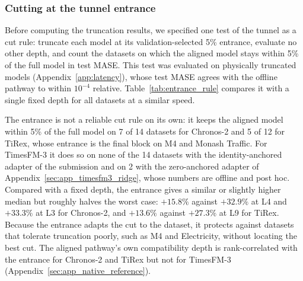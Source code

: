 
\subsubsection{Cutting at the tunnel entrance}
\label{sec:app_entrance_rule}

Before computing the truncation results, we specified one test of the tunnel as a cut rule: truncate each model at its validation-selected 5\% entrance, evaluate no other depth, and count the datasets on which the aligned model stays within 5\% of the full model in test MASE. This test was evaluated on physically truncated models (Appendix~\ref{app:latency}), whose test MASE agrees with the offline pathway to within $10^{-4}$ relative. Table~\ref{tab:entrance_rule} compares it with a single fixed depth for all datasets at a similar speed.

The entrance is not a reliable cut rule on its own: it keeps the aligned model within 5\% of the full model on 7 of 14 datasets for Chronos-2 and 5 of 12 for TiRex, whose entrance is the final block on M4 and Monash Traffic. For TimesFM-3 it does so on none of the 14 datasets with the identity-anchored adapter of the submission and on 2 with the zero-anchored adapter of Appendix~\ref{sec:app_timesfm3_ridge}, whose numbers are offline and post hoc. Compared with a fixed depth, the entrance gives a similar or slightly higher median but roughly halves the worst case: $+15.8\%$ against $+32.9\%$ at L4 and $+33.3\%$ at L3 for Chronos-2, and $+13.6\%$ against $+27.3\%$ at L9 for TiRex. Because the entrance adapts the cut to the dataset, it protects against datasets that tolerate truncation poorly, such as M4 and Electricity, without locating the best cut. The aligned pathway's own compatibility depth is rank-correlated with the entrance for Chronos-2 and TiRex but not for TimesFM-3 (Appendix~\ref{sec:app_native_reference}).


